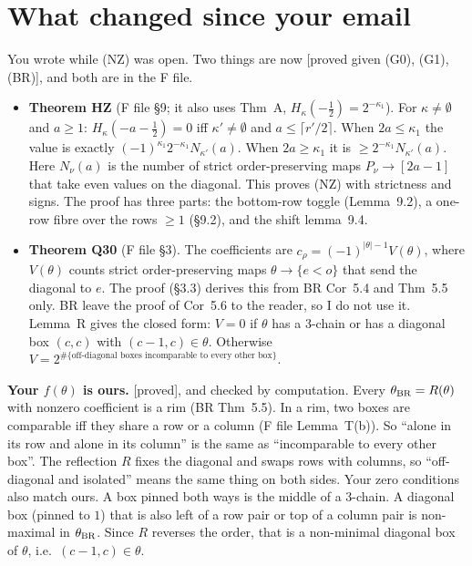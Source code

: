 \documentclass[10pt]{amsart}
\newcommand{\grade}[1]{\textsf{[#1]}}
\theoremstyle{remark}
\begin{document}
\section{What changed since your email}
You wrote while (NZ) was open. Two things are now \grade{proved given (G0), (G1), (BR)}, and both are in the F file.
\begin{itemize}
\item \textbf{Theorem HZ} (F file \S9; it also uses Thm~A, $H_\kappa(-\tfrac12)=2^{-\kappa_1}$). For $\kappa\ne\emptyset$ and
  $a\ge1$: $H_\kappa(-a-\tfrac12)=0$ iff $\kappa'\ne\emptyset$ and $a\le\lceil r'/2\rceil$. When $2a\le\kappa_1$ the value is
  exactly $(-1)^{\kappa_1}2^{-\kappa_1}N_{\kappa'}(a)$. When $2a\ge\kappa_1$ it is $\ge 2^{-\kappa_1}N_{\kappa'}(a)$. Here
  $N_\nu(a)$ is the number of strict order-preserving maps $P_\nu\to[2a-1]$ that take even values on the diagonal.
  This proves (NZ) with strictness and signs. The proof has three parts: the bottom-row toggle (Lemma~9.2), a one-row
  fibre over the rows $\ge1$ (\S9.2), and the shift lemma~9.4.
\item \textbf{Theorem Q30} (F file \S3). The coefficients are $c_\rho=(-1)^{|\theta|-1}V(\theta)$, where $V(\theta)$ counts
  strict order-preserving maps $\theta\to\{e<o\}$ that send the diagonal to $e$. The proof (\S3.3) derives this from BR
  Cor~5.4 and Thm~5.5 only. BR leave the proof of Cor~5.6 to the reader, so I do not use it. Lemma~R gives the closed form:
  $V=0$ if $\theta$ has a 3-chain or has a diagonal box $(c,c)$ with $(c-1,c)\in\theta$. Otherwise
  $V=2^{\#\{\text{off-diagonal boxes incomparable to every other box}\}}$.
\end{itemize}

\textbf{Your $f(\theta)$ is ours.} \grade{proved}, and checked by computation. Every $\theta_{\rm BR}=R(\theta)$ with nonzero
coefficient is a rim (BR Thm~5.5). In a rim, two boxes are comparable iff they share a row or a column (F file Lemma~T(b)).
So ``alone in its row and alone in its column'' is the same as ``incomparable to every other box''. The reflection $R$
fixes the diagonal and swaps rows with columns, so ``off-diagonal and isolated'' means the same thing on both sides. Your
zero conditions also match ours. A box pinned both ways is the middle of a 3-chain. A diagonal box (pinned to $1$) that is
also left of a row pair or top of a column pair is non-maximal in $\theta_{\rm BR}$. Since $R$ reverses the order, that is
a non-minimal diagonal box of $\theta$, i.e.\ $(c-1,c)\in\theta$.
\end{document}
